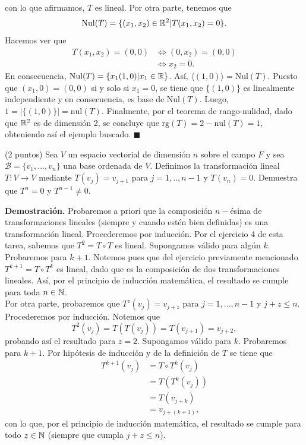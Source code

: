 \documentclass[11pt]{scrartcl}
\begin{document}
con lo que afirmamos, $T$ es lineal. Por otra parte, tenemos que
\[
\text{Nul}(T)=\{(x_1,x_2)\in \mathbb R^2 | T(x_1,x_2)=0\}.
\]
Hacemos ver que
\begin{align*}
    T(x_1,x_2)=(0,0) &\iff (0,x_2)=(0,0) \\
    &\iff x_2=0.
\end{align*}
En consecuencia, $\text{Nul}(T)=\{x_1(1,0)|x_1 \in \mathbb R\}$. Así, $\langle(1,0)\rangle=\text{Nul}(T)$. Puesto que $(x_1,0)=(0,0)$ si y solo si $x_1=0$, se tiene que
$\{(1,0)\}$ es linealmente independiente y en consecuencia, es base de $\text{Nul}(T)$. Luego, $1=|\{(1,0)\}|=\text{nul}(T)$. Finalmente, por el teorema de rango-nulidad,
dado que $\mathbb R^2$ es de dimensión 2, se concluye que $\text{rg}(T)=2-\text{nul}(T)=1$, obteniendo así el ejemplo buscado. $\blacksquare$
\newpage
\begin{mdframed}[style=mdpurplebox, frametitle={Ejercicio 6, Tarea 09, Álgebra Lineal I}]
    (2 puntos) Sea $V$ un espacio vectorial de dimensión $n$ sobre el campo $F$ y sea $\mathcal{B}=\{v_1,...,v_n\}$ una base ordenada
    de $V$. Definimos la transformación lineal $T:V\rightarrow V$ mediante $T(v_j)=v_{j+1}$ para $j=1,..,n-1$ y $T(v_n)=0$. Demuestra
    que $T^n=0$ y $T^{n-1}\neq 0$.
\end{mdframed}
\textbf{Demostración.} Probaremos a priori que la composición $n-$ésima de transformaciones lineales (siempre y cuando estén bien definidas) es una transformación lineal.
Procederemos por inducción. Por el ejercicio 4 de esta tarea, sabemos que $T^2=T\circ T$ es lineal. Supongamos válido para algún $k$. Probaremos para $k+1$. Notemos pues que del ejercicio
previamente mencionado $T^{k+1}=T\circ T^{k}$ es lineal, dado que es la composición de dos transformaciones lineales. Así, por el principio de inducción matemática, el resultado se
cumple para toda $n \in \mathbb N$. \\
Por otra parte, probaremos que $T^z(v_j)=v_{j+z}$ para $j=1,...,n-1$ y $j+z \leq n$.  Procederemos por inducción. Notemos que
\[
T^2(v_j)=T(T(v_j))=T(v_{j+1})=v_{j+2},
\]
probando así el resultado para $z=2$. Supongamos válido para $k$. Probaremos para $k+1$. Por hipótesis de inducción y de la definición de $T$ se tiene que
\begin{align*}
    T^{k+1}(v_j) &= T\circ T^k(v_j) \\
    &= T(T^k(v_j)) \\
    &= T(v_{j+k}) \\
    &= v_{j+(k+1)}, \tag{1}
\end{align*}
con lo que, por el principio de inducción matemática, el resultado se cumple para todo $z \in \mathbb N$ (siempre que cumpla $j+z \leq n$).
\end{document}
